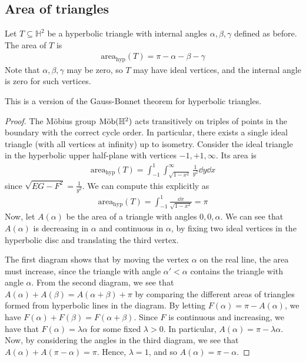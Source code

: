 \subsection{Area of triangles}
\begin{theorem}
	Let $T \subseteq \mathbb H^2$ be a hyperbolic triangle with internal angles $\alpha, \beta, \gamma$ defined as before.
	The area of $T$ is
	\begin{align*}
		\mathrm{area}_{\text{hyp}}(T) = \pi - \alpha - \beta - \gamma
	\end{align*}
	Note that $\alpha, \beta, \gamma$ may be zero, so $T$ may have ideal vertices, and the internal angle is zero for such vertices.
\end{theorem}
This is a version of the Gauss-Bonnet theorem for hyperbolic triangles.
\begin{proof}
	The M\"obius group $\text{M\"ob}(\mathbb H^2)$ acts transitively on triples of points in the boundary with the correct cycle order.
	In particular, there exists a single ideal triangle (with all vertices at infinity) up to isometry.
	Consider the ideal triangle in the hyperbolic upper half-plane with vertices $-1, +1, \infty$.
	Its area is
	\begin{align*}
		\mathrm{area}_{\text{hyp}}(T) = \int_{-1}^1 \int_{\sqrt{1-x^2}}^\infty \frac{1}{y^2} \dd{y} \dd{x}
	\end{align*}
	since $\sqrt{EG - F^2} = \frac{1}{y^2}$.
	We can compute this explicitly as
	\begin{align*}
		\mathrm{area}_{\text{hyp}}(T) = \int_{-1}^1 \frac{\dd{x}}{\sqrt{1-x^2}} = \pi
	\end{align*}
	Now, let $A(\alpha)$ be the area of a triangle with angles $0, 0, \alpha$.
	We can see that $A(\alpha)$ is decreasing in $\alpha$ and continuous in $\alpha$, by fixing two ideal vertices in the hyperbolic disc and translating the third vertex.
	\begin{center}
		\quad
		\quad
	\end{center}
	The first diagram shows that by moving the vertex $\alpha$ on the real line, the area must increase, since the triangle with angle $\alpha' < \alpha$ contains the triangle with angle $\alpha$.
	From the second diagram, we see that $A(\alpha) + A(\beta) = A(\alpha + \beta) + \pi$ by comparing the different areas of triangles formed from hyperbolic lines in the diagram.
	By letting $F(\alpha) = \pi - A(\alpha)$, we have $F(\alpha) + F(\beta) = F(\alpha + \beta)$.
	Since $F$ is continuous and increasing, we have that $F(\alpha) = \lambda \alpha$ for some fixed $\lambda > 0$.
	In particular, $A(\alpha) = \pi - \lambda \alpha$.
	Now, by considering the angles in the third diagram, we see that $A(\alpha) + A(\pi - \alpha) = \pi$.
	Hence, $\lambda = 1$, and so $A(\alpha) = \pi - \alpha$.


\end{proof}
